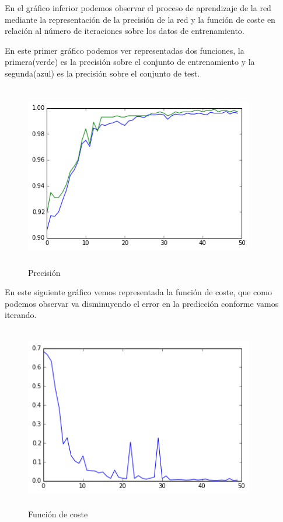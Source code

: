\documentclass{article}
\begin{document}
En el gráfico inferior podemos observar el proceso de aprendizaje de la red mediante la representación de la precisión de la red y la función de coste en relación al número de iteraciones sobre los datos de entrenamiento.

En este primer gráfico podemos ver representadas dos funciones, la primera(verde) es la precisión sobre el conjunto de entrenamiento y la segunda(azul) es la precisión sobre el conjunto de test.

\begin{figure}[H]
  \centering
  \includegraphics[width=100mm, height=80mm]{images/accuracy.png}
  \caption{Precisión}
\end{figure}

En este siguiente gráfico vemos representada la función de coste, que como podemos observar va disminuyendo el error en la predicción conforme vamos iterando.

\begin{figure}[H]
  \centering
  \includegraphics[width=100mm, height=80mm]{images/loss_function.png}
  \caption{Función de coste}
\end{figure}
\end{document}
